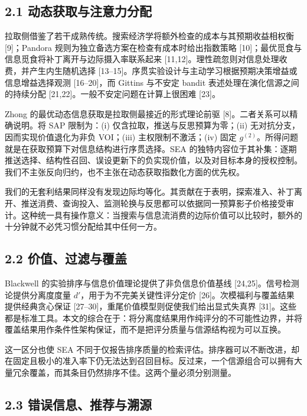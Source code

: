 \documentclass[
  chinese,
  11pt]{article}
\begin{document}
\subsection{2.1 动态获取与注意力分配}\label{ux52a8ux6001ux83b7ux53d6ux4e0eux6ce8ux610fux529bux5206ux914d}

拉取侧借鉴了若干成熟传统。搜索经济学将额外检查的成本与其预期收益相权衡 {[}9{]}；Pandora 规则为独立备选方案在检查有成本时给出指数策略 {[}10{]}；最优觅食与信息觅食将补丁离开与边际摄入率联系起来 {[}11,12{]}。理性疏忽则对信息处理收费，并产生内生随机选择 {[}13--15{]}。序贯实验设计与主动学习根据预期决策增益或信息增益选择观测 {[}16--20{]}，而 Gittins 与不安定 bandit 表述处理在演化信源之间的持续分配 {[}21,22{]}。一般不安定问题在计算上很困难 {[}23{]}。

Zhong 的最优动态信息获取是拉取侧最接近的形式理论前驱 {[}8{]}。二者关系可以精确说明。将 SAP 限制为：(i) 仅含拉取，推送与反思预算为零；(ii) 无对抗分支，因而实现价值退化为非负 VOI；(iii) 主权限制不激活；(iv) 固定 \(g^{(2)}\)。所得问题就是在获取预算下对信息结构进行序贯选择。SEA 的独特内容位于其补集：逐期推送选择、结构性召回、误设更新下的负实现价值，以及对目标本身的授权控制。我们不主张反向归约，也不主张在动态获取指数化方面的优先权。

我们的无套利结果同样没有发现边际均等化。其贡献在于表明，探索准入、补丁离开、推送消费、查询投入、监测轮换与反思都可以依据同一预算影子价格接受审计。这种统一具有操作意义：当搜索与信息流消费的边际价值可以比较时，额外的十分钟就不必凭习惯分配给其中任何一方。

\subsection{2.2 价值、过滤与覆盖}\label{ux4ef7ux503cux8fc7ux6ee4ux4e0eux8986ux76d6}

Blackwell 的实验排序与信息价值理论提供了非负信息价值基线 {[}24,25{]}。信号检测论提供分离度度量 \(d'\)，用于为不完美关键性评分定价 {[}26{]}。次模福利与覆盖结果提供经典贪心保证 {[}27--30{]}，重尾价值模型则促使我们给出显式失真界 {[}31{]}。这些都是标准工具。本文的综合在于：将分离度结果用作纯评分的不可能性边界，并将覆盖结果用作条件性架构保证，而不是把评分质量与信源结构视为可以互换。

这一区分也使 SEA 不同于仅报告排序质量的检索评估。排序器可以不断改进，却在固定且极小的准入率下仍无法达到召回目标。反过来，一个信源组合可以拥有大量冗余覆盖，而其条目仍然排序不佳。这两个量必须分别测量。

\subsection{2.3 错误信息、推荐与溯源}\label{ux9519ux8befux4fe1ux606fux63a8ux8350ux4e0eux6eafux6e90}
\end{document}
